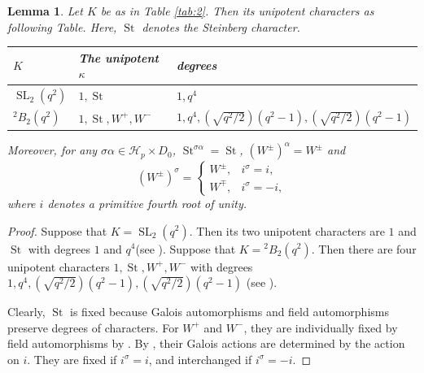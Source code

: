 \documentclass[11pt,a4paper]{article}
\numberwithin{equation}{section}
\newtheorem{lemma}[theorem]{Lemma}
\theoremstyle{definition}
\theoremstyle{remark}
\newcommand{\SL}{\operatorname{SL}}
\DeclareMathOperator{\St}{St}
\newcommand{\HH}{\mathcal H}
\begin{document}
\begin{lemma}\label{defect zero characters of $K$}
Let $K$ be as in Table \ref{tab:2}. Then its unipotent characters as following Table. Here, $\St$ denotes the Steinberg character.
\begin{table}[ht]
\centering
\begin{tabular}{lll}
\toprule
\(K\) & The unipotent \(\kappa\) & degrees \\
\midrule
\(\SL_2(q^2)\) &  $1,\St$ & $1, q^4$ \\
\({}^2B_2(q^2)\)& $1,\St, W^+,W^-$ & $1,q^4, (\sqrt{q^2/2})(q^2-1), (\sqrt{q^2/2})(q^2-1)$ \\
\bottomrule
\end{tabular}
\end{table}
Moreover, for any \(\sigma\alpha\in\HH_p\times D_0\),  
$\St^{\sigma\alpha}=\St$, $(W^\pm)^\alpha=W^\pm$ and 
\[(W^\pm)^\sigma=
		\begin{cases}
			W^\pm,&i^\sigma=i,\\
			W^\mp,&i^\sigma=-i,
		\end{cases}
        \]
where $i$ denotes a primitive fourth root of unity.
\end{lemma}
\begin{proof}
Suppose that \(K=\SL_2(q^2)\). Then its two unipotent characters are $1$ and $\St$ with degrees $1$ and $q^4$(see \cite[Section 4]{W13}).
Suppose that $K={}^2B_2(q^2)$. Then there are four unipotent characters $1,\St,W^+,W^-$ with degrees $1,q^4,(\sqrt{q^2/2})(q^2-1),(\sqrt{q^2/2})(q^2-1)$ (see \cite[Section 2]{Ghaffarzadeh}).  

Clearly, $\St$ is fixed because Galois automorphisms and field automorphisms preserve degrees of characters. For \(W^+\) and \(W^-\), they are individually fixed by field automorphisms by \cite[Lemma 2.2]{Ghaffarzadeh}. By \cite[Proof of Theorem B]{Johansson}, their Galois actions are determined by the action on \(i\). They are fixed if \(i^\sigma=i\), and interchanged if \(i^\sigma=-i\). 
\end{proof}
\end{document}
